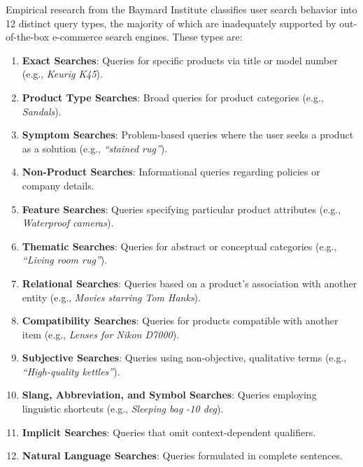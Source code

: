 \documentclass{article}
\begin{document}
    Empirical research from the Baymard Institute classifies user search behavior into 12 distinct query types, the majority of which are inadequately supported by out-of-the-box e-commerce search engines. These types are:

    \begin{enumerate}
        \item \textbf{Exact Searches}: Queries for specific products via title or model number (e.g., \textit{Keurig K45}).
        \item \textbf{Product Type Searches}: Broad queries for product categories (e.g., \textit{Sandals}).
        \item \textbf{Symptom Searches}: Problem-based queries where the user seeks a product as a solution (e.g., \textit{“stained rug”}).
        \item \textbf{Non-Product Searches}: Informational queries regarding policies or company details.
        \item \textbf{Feature Searches}: Queries specifying particular product attributes (e.g., \textit{Waterproof cameras}).
        \item \textbf{Thematic Searches}: Queries for abstract or conceptual categories (e.g., \textit{“Living room rug”}).
        \item \textbf{Relational Searches}: Queries based on a product's association with another entity (e.g., \textit{Movies starring Tom Hanks}).
        \item \textbf{Compatibility Searches}: Queries for products compatible with another item (e.g., \textit{Lenses for Nikon D7000}).
        \item \textbf{Subjective Searches}: Queries using non-objective, qualitative terms (e.g., \textit{“High-quality kettles”}).
        \item \textbf{Slang, Abbreviation, and Symbol Searches}: Queries employing linguistic shortcuts (e.g., \textit{Sleeping bag -10 deg}).
        \item \textbf{Implicit Searches}: Queries that omit context-dependent qualifiers.
        \item \textbf{Natural Language Searches}: Queries formulated in complete sentences.
    \end{enumerate}
\end{document}
